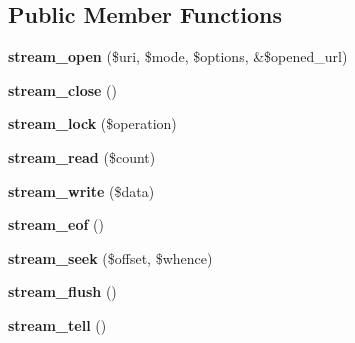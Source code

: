 \subsection*{Public Member Functions}
\begin{DoxyCompactItemize}
\item 
\hypertarget{interfaceStreamWrapperInterface_a2e091398ea045486ec853dc67ff82bd1}{
{\bfseries stream\_\-open} (\$uri, \$mode, \$options, \&\$opened\_\-url)}
\label{interfaceStreamWrapperInterface_a2e091398ea045486ec853dc67ff82bd1}

\item 
\hypertarget{interfaceStreamWrapperInterface_acb77006c4c8917d005edd6d27e16cd81}{
{\bfseries stream\_\-close} ()}
\label{interfaceStreamWrapperInterface_acb77006c4c8917d005edd6d27e16cd81}

\item 
\hypertarget{interfaceStreamWrapperInterface_abb2f3c18a8bf3051e8a43b6ec932c1f0}{
{\bfseries stream\_\-lock} (\$operation)}
\label{interfaceStreamWrapperInterface_abb2f3c18a8bf3051e8a43b6ec932c1f0}

\item 
\hypertarget{interfaceStreamWrapperInterface_a15f454ec41c1d50c514e689f2de86dad}{
{\bfseries stream\_\-read} (\$count)}
\label{interfaceStreamWrapperInterface_a15f454ec41c1d50c514e689f2de86dad}

\item 
\hypertarget{interfaceStreamWrapperInterface_a96d2c4cbfe77033dba10767cd311894a}{
{\bfseries stream\_\-write} (\$data)}
\label{interfaceStreamWrapperInterface_a96d2c4cbfe77033dba10767cd311894a}

\item 
\hypertarget{interfaceStreamWrapperInterface_a03927c502835cb3998e04cb75da65940}{
{\bfseries stream\_\-eof} ()}
\label{interfaceStreamWrapperInterface_a03927c502835cb3998e04cb75da65940}

\item 
\hypertarget{interfaceStreamWrapperInterface_a300761d6fecd4d539fdb43bc6683735e}{
{\bfseries stream\_\-seek} (\$offset, \$whence)}
\label{interfaceStreamWrapperInterface_a300761d6fecd4d539fdb43bc6683735e}

\item 
\hypertarget{interfaceStreamWrapperInterface_aa9b5ae23dc951dc4ea3a1738e04c98f7}{
{\bfseries stream\_\-flush} ()}
\label{interfaceStreamWrapperInterface_aa9b5ae23dc951dc4ea3a1738e04c98f7}

\item 
\hypertarget{interfaceStreamWrapperInterface_ac122a27ef432ea39a340ec5fd881a3fa}{
{\bfseries stream\_\-tell} ()}
\label{interfaceStreamWrapperInterface_ac122a27ef432ea39a340ec5fd881a3fa}


\end{DoxyCompactItemize}
